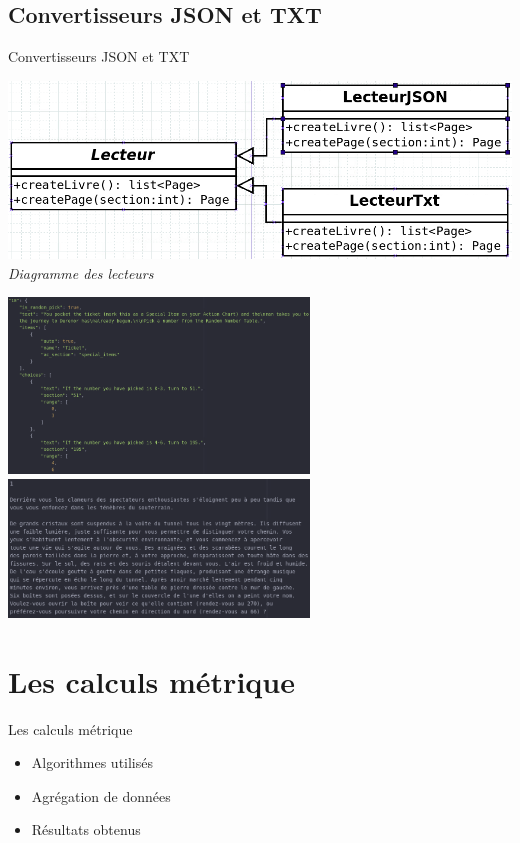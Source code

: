 \documentclass[aspectratio=169,xcolor=dvipsnames]{beamer}
\begin{document}
\subsection{Convertisseurs JSON et TXT}
\begin{frame}{Convertisseurs JSON et TXT}
                \begin{center}
            \begin{minipage}{.33\textwidth}
    \centering
        \vspace{1cm}
        \includegraphics[width=1.2\textwidth]{diagramme_lecteurs.png}{\small\textsl{\\Diagramme des lecteurs}}
        \end{minipage}
        \begin{minipage}{.66\textwidth}
        \centering
        \includegraphics[width=0.6\textwidth]{livre_json.png}
        \includegraphics[width=0.6\textwidth]{livre_txt.png}
    \end{minipage}
    \end{center}
\end{frame}

\section{Les calculs métrique}
\begin{frame}{Les calculs métrique}
    \begin{center}
    \begin{itemize}
        \item Algorithmes utilisés
        \item Agrégation de données
        \item Résultats obtenus
    \end{itemize}
    \end{center}
\end{frame}
\end{document}
